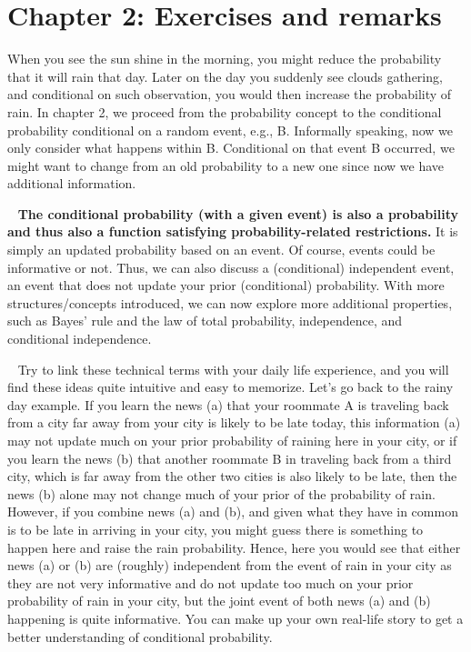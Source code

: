 

\chapter{Chapter 2: Exercises and remarks}
When you see the sun shine in the morning, you might reduce the probability that it will rain that day. Later on the day you suddenly see clouds gathering, and conditional on such observation, you would then increase the probability of rain. In chapter 2, we proceed from the probability concept to the conditional probability conditional on a random event, e.g., B. Informally speaking, now we only consider what happens within B. Conditional on that event B occurred, we might want to change from an old probability to a new one since now we have additional information. 

~\newline 
\textbf{The conditional probability (with a given event) is also a probability and thus also a function satisfying probability-related restrictions.} It is simply an updated probability based on an event. Of course, events could be informative or not. Thus, we can also discuss a (conditional) independent event, an event that does not update your prior (conditional) probability. With more structures/concepts introduced, we can now explore more additional properties, such as Bayes' rule and the law of total probability, independence, and conditional independence. 

~\newline 
Try to link these technical terms with your daily life experience, and you will find these ideas quite intuitive and easy to memorize. Let's go back to the rainy day example. If you learn the news (a) that your roommate A is traveling back from a city far away from your city is likely to be late today, this information (a) may not update much on your prior probability of raining here in your city, or if you learn the news (b) that another roommate B in traveling back from a third city, which is far away from the other two cities is also likely to be late, then the news (b) alone may not change much of your prior of the probability of rain. However, if you combine news (a) and (b), and given what they have in common is to be late in arriving in your city, you might guess there is something to happen here and raise the rain probability. Hence, here you would see that either news (a) or (b) are (roughly) independent from the event of rain in your city as they are not very informative and do not update too much on your prior probability of rain in your city, but the joint event of both news (a) and (b) happening is quite informative. You can make up your own real-life story to get a better understanding of conditional probability. 

